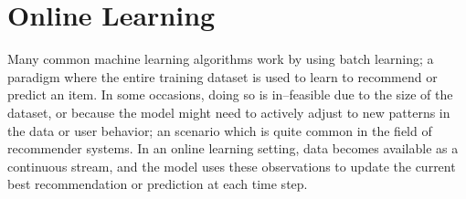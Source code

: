 \section{Online Learning} \label{sect:theory:online-learning}

Many common machine learning algorithms work by using batch learning; a paradigm where the entire training dataset is used to learn to recommend or predict an item. In some occasions, doing so is in--feasible due to the size of the dataset, or because the model might need to actively adjust to new patterns in the data or user behavior; an scenario which is quite common in the field of recommender systems. In an online learning setting, data becomes available as a continuous stream, and the model uses these observations to update the current best recommendation or prediction at each time step.
